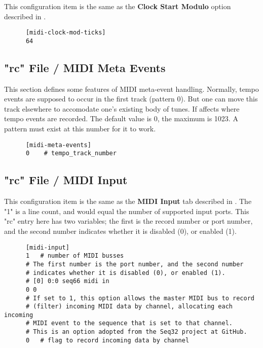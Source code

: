    This configuration item is the same as the
   \textbf{Clock Start Modulo} option described in
   .

   \begin{verbatim}
      [midi-clock-mod-ticks]
      64
   \end{verbatim}

\subsection{"rc" File / MIDI Meta Events}
\label{subsec:rc_file_midi_meta}

   This section defines some features of MIDI meta-event handling.  Normally,
   tempo events are supposed to occur in the first track (pattern 0).  But one
   can move this track elsewhere to accomodate one's existing body of tunes.
   If affects where tempo events are recorded.  The default value is 0, the
   maximum is 1023.  A pattern must exist at this number for it to work.

   \begin{verbatim}
      [midi-meta-events]
      0    # tempo_track_number
   \end{verbatim}

\subsection{"rc" File / MIDI Input}
\label{subsec:rc_file_midi_input}

   This configuration item is the same as the 
   \textbf{MIDI Input} tab described in
   .
   The "1" is a line count, and would equal the number of
   supported input ports.
   This "rc" entry here has two variables; the first is the record number or
   port number, and the second number indicates whether it is disabled (0),
   or enabled (1).

   \begin{verbatim}
      [midi-input]
      1   # number of MIDI busses
      # The first number is the port number, and the second number
      # indicates whether it is disabled (0), or enabled (1).
      # [0] 0:0 seq66 midi in
      0 0
      # If set to 1, this option allows the master MIDI bus to record
      # (filter) incoming MIDI data by channel, allocating each incoming
      # MIDI event to the sequence that is set to that channel.
      # This is an option adopted from the Seq32 project at GitHub.
      0   # flag to record incoming data by channel
   \end{verbatim}

